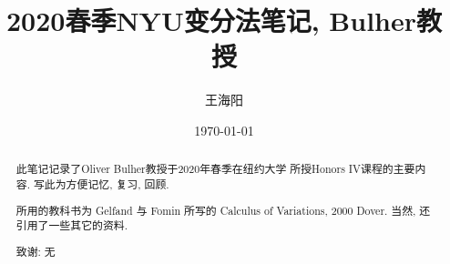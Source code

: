 \documentclass[]{article}
\title{2020春季NYU变分法笔记, Bulher教授}
\author{王海阳}
\date{\today}
\begin{document}
    \maketitle

    \begin{abstract}
        此笔记记录了Oliver Bulher教授于2020年春季在纽约大学
        所授Honors IV课程的主要内容. 写此为方便记忆, 复习, 回顾.

        所用的教科书为 Gelfand 与 Fomin 所写的
        Calculus of Variations, 2000 Dover.
        当然, 还引用了一些其它的资料.

        致谢: 无
    \end{abstract}

    \tableofcontents







\end{document}
